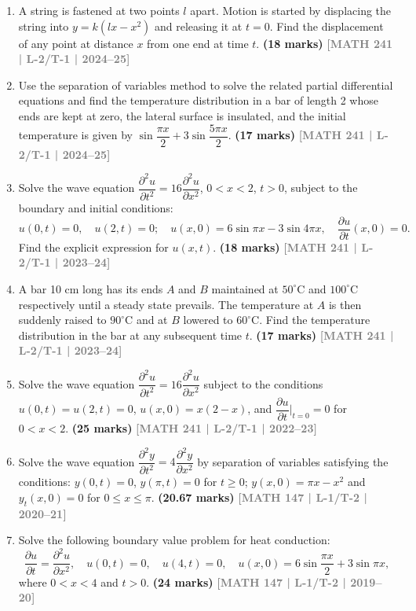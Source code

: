 \documentclass[12pt,a3paper]{article}
\newcommand{\yr}[1]{\hfill\textcolor{gray}{\small\textbf{[#1]}}}
\newcommand{\mk}[1]{\textcolor{orange!70!black}{\small\textbf{(#1 marks)}}}
\begin{document}
\begin{enumerate}

\item A string is fastened at two points $l$ apart. Motion is started by displacing the string into $y=k(lx-x^{2})$ and releasing it at $t=0$. Find the displacement of any point at distance $x$ from one end at time $t$.
\mk{18} \yr{MATH 241 | L-2/T-1 | 2024--25}


\item Use the separation of variables method to solve the related partial differential equations and find the temperature distribution in a bar of length 2 whose ends are kept at zero, the lateral surface is insulated, and the initial temperature is given by $\sin\dfrac{\pi x}{2}+3\sin\dfrac{5\pi x}{2}$.
\mk{17} \yr{MATH 241 | L-2/T-1 | 2024--25}


\item Solve the wave equation $\dfrac{\partial^{2}u}{\partial t^{2}}=16\dfrac{\partial^{2}u}{\partial x^{2}}$, $0<x<2$, $t>0$, subject to the boundary and initial conditions: 
\[
u(0,t)=0, \quad u(2,t)=0; \quad u(x,0)=6\sin\pi x-3\sin 4\pi x, \quad \dfrac{\partial u}{\partial t}(x,0)=0.
\]
Find the explicit expression for $u(x,t)$.
\mk{18} \yr{MATH 241 | L-2/T-1 | 2023--24}


\item A bar 10 cm long has its ends $A$ and $B$ maintained at $50^{\circ}$C and $100^{\circ}$C respectively until a steady state prevails. The temperature at $A$ is then suddenly raised to $90^{\circ}$C and at $B$ lowered to $60^{\circ}$C. Find the temperature distribution in the bar at any subsequent time $t$.
\mk{17} \yr{MATH 241 | L-2/T-1 | 2023--24}


\item Solve the wave equation $\dfrac{\partial^{2}u}{\partial t^{2}}=16\dfrac{\partial^{2}u}{\partial x^{2}}$ subject to the conditions $u(0,t)=u(2,t)=0$, $u(x,0)=x(2-x)$, and $\dfrac{\partial u}{\partial t}\Big|_{t=0}=0$ for $0<x<2$.
\mk{25} \yr{MATH 241 | L-2/T-1 | 2022--23}


\item Solve the wave equation $\dfrac{\partial^{2}y}{\partial t^{2}}=4\dfrac{\partial^{2}y}{\partial x^{2}}$ by separation of variables satisfying the conditions: $y(0,t)=0$, $y(\pi,t)=0$ for $t\ge 0$; $y(x,0)=\pi x-x^{2}$ and $y_{t}(x,0)=0$ for $0\le x\le\pi$.
\mk{20.67} \yr{MATH 147 | L-1/T-2 | 2020--21}


\item Solve the following boundary value problem for heat conduction:
\[
\frac{\partial u}{\partial t}=\frac{\partial^{2}u}{\partial x^{2}},\quad u(0,t)=0,\quad u(4,t)=0,\quad u(x,0)=6\sin\frac{\pi x}{2}+3\sin\pi x,
\]
where $0<x<4$ and $t>0$.
\mk{24} \yr{MATH 147 | L-1/T-2 | 2019--20}



\end{enumerate}
\end{document}
